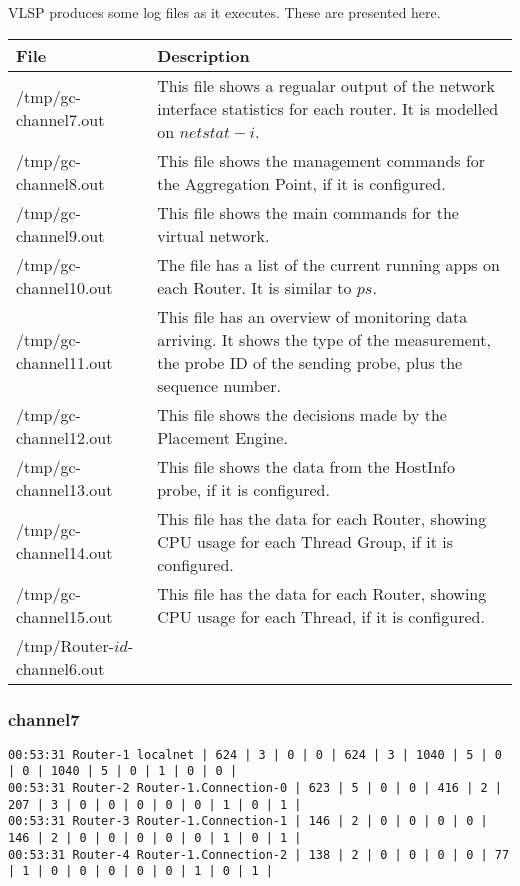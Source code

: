 VLSP produces some log files as it executes.
These are presented here.


{
\small

\begin{longtable}{ | p{4.7cm} | p{9.5cm} | }

\hline
\textbf{File} & \textbf{Description} \\
\hline

/tmp/gc-channel7.out & This file shows a regualar output of the
network interface statistics for each router. It is modelled on
$netstat -i$. \\
\hline
/tmp/gc-channel8.out & This file shows the management commands for the
Aggregation Point, if it is configured.\\
\hline
/tmp/gc-channel9.out & This file shows the main commands for the
virtual network. \\
\hline
/tmp/gc-channel10.out & The file has a list of the current running
apps on each Router.  It is similar to $ps$.\\
\hline
/tmp/gc-channel11.out & This file has an overview of monitoring data
arriving. It shows the type of the measurement, the probe ID of the
sending probe, plus the sequence number. \\
\hline
/tmp/gc-channel12.out & This file shows the decisions made by the
Placement Engine.\\
\hline
/tmp/gc-channel13.out & This file shows the data from the HostInfo
probe, if it is configured.\\
\hline
/tmp/gc-channel14.out & This file has the data for each Router,
showing CPU usage for each Thread Group, if it is configured.\\
\hline
/tmp/gc-channel15.out & This file has the data for each Router,
showing CPU usage for each Thread, if it is configured.\\
\hline
/tmp/Router-$id$-channel6.out & \\
\hline

\end{longtable}

\normalsize
}

\subsubsection*{channel7}

\begin{lstlisting}[language=config]
00:53:31 Router-1 localnet | 624 | 3 | 0 | 0 | 624 | 3 | 1040 | 5 | 0 | 0 | 1040 | 5 | 0 | 1 | 0 | 0 | 
00:53:31 Router-2 Router-1.Connection-0 | 623 | 5 | 0 | 0 | 416 | 2 | 207 | 3 | 0 | 0 | 0 | 0 | 0 | 1 | 0 | 1 | 
00:53:31 Router-3 Router-1.Connection-1 | 146 | 2 | 0 | 0 | 0 | 0 | 146 | 2 | 0 | 0 | 0 | 0 | 0 | 1 | 0 | 1 | 
00:53:31 Router-4 Router-1.Connection-2 | 138 | 2 | 0 | 0 | 0 | 0 | 77 | 1 | 0 | 0 | 0 | 0 | 0 | 1 | 0 | 1 | 

\end{lstlisting}


